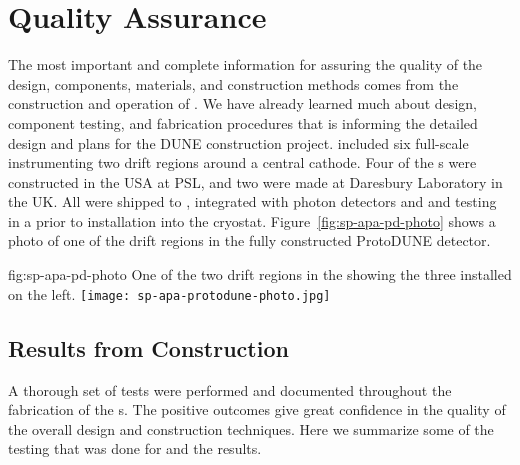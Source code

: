 \section{Quality Assurance}
\label{sec:fdsp-apa-qa}



The most important and complete information for assuring the quality of the  design, components, materials, and construction methods comes from the construction and operation of .  We have already learned much about design, component testing, and fabrication procedures that is informing the detailed design and plans for the DUNE  construction project.  included six full-scale   instrumenting two drift regions around a central cathode.  Four of the  s were constructed in the USA at %
PSL, and two were made at Daresbury Laboratory in the UK. All were shipped to , integrated with photon detectors and  and testing in a \coldbox prior to installation into the  cryostat.  Figure~\ref{fig:sp-apa-pd-photo} shows a photo of one of the drift regions in the fully constructed ProtoDUNE detector.

\begin{dunefigure}{fig:sp-apa-pd-photo}
{One of the two drift regions in the  showing the three installed  on the left.}
\texttt{[image: sp-apa-protodune-photo.jpg]}
\end{dunefigure}

\subsection{Results from  Construction}
\label{sec:fdsp-apa-qa-protodune-const}

A thorough set of  tests were performed and documented throughout the fabrication of the  s.  The positive outcomes give great confidence in the quality of the overall  design  and construction techniques.  Here we summarize some of the testing that was done for  and the results.   


